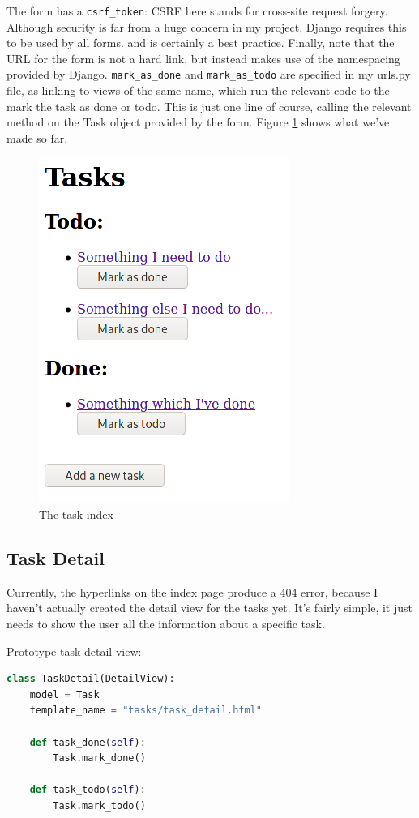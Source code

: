 \documentclass{article}
\begin{document}
The form has a \texttt{csrf\_token}:
CSRF here stands for cross-site request forgery.
Although security is far from a huge concern in my project,
Django requires this to be used by all forms.
and is certainly a best practice.
Finally, note that the URL for the form is not a hard link,
but instead makes use of the namespacing provided by Django.
\texttt{mark\_as\_done} and \texttt{mark\_as\_todo} are specified in my urls.py file,
as linking to views of the same name,
which run the relevant code to the mark the task as done or todo.
This is just one line of course,
calling the relevant method on the Task object provided by the form.
Figure \ref{fig:task_index1} shows what we've made so far.

\begin{figure}[H]
	\centering
	\includegraphics[width=0.5\linewidth]{Screenshots/task_index.png}
	\caption{The task index}
	\label{fig:task_index1}
\end{figure}

\subsection{Task Detail}
Currently,
the hyperlinks on the index page produce a 404 error,
because I haven't actually created the detail view for the tasks yet.
It's fairly simple,
it just needs to show the user all the information about a specific task.

Prototype task detail view:
\begin{lstlisting}[language=Python]
class TaskDetail(DetailView):
    model = Task
    template_name = "tasks/task_detail.html"

    def task_done(self):
        Task.mark_done()

    def task_todo(self):
        Task.mark_todo()
\end{lstlisting}
\end{document}
